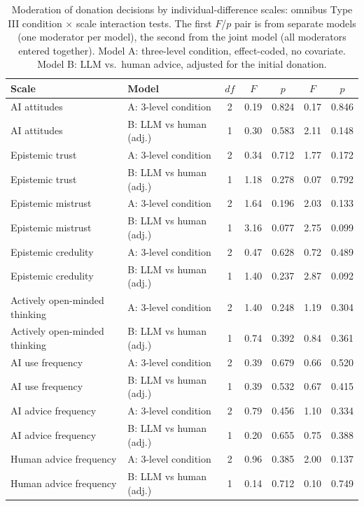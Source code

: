 \begin{table}

\caption{\label{tab:scale_moderation}Moderation of donation decisions by individual-difference scales: omnibus Type III condition $\times$ scale interaction tests. The first $F$/$p$ pair is from separate models (one moderator per model), the second from the joint model (all moderators entered together). Model A: three-level condition, effect-coded, no covariate. Model B: LLM vs.\ human advice, adjusted for the initial donation.}
\centering
\begin{tabular}[t]{llccccc}
\toprule
Scale & Model & $df$ & $F$ & $p$ & $F$ & $p$\\
\midrule
AI attitudes & A: 3-level condition & 2 & 0.19 & 0.824 & 0.17 & 0.846\\
AI attitudes & B: LLM vs human (adj.) & 1 & 0.30 & 0.583 & 2.11 & 0.148\\
Epistemic trust & A: 3-level condition & 2 & 0.34 & 0.712 & 1.77 & 0.172\\
Epistemic trust & B: LLM vs human (adj.) & 1 & 1.18 & 0.278 & 0.07 & 0.792\\
Epistemic mistrust & A: 3-level condition & 2 & 1.64 & 0.196 & 2.03 & 0.133\\
\addlinespace
Epistemic mistrust & B: LLM vs human (adj.) & 1 & 3.16 & 0.077 & 2.75 & 0.099\\
Epistemic credulity & A: 3-level condition & 2 & 0.47 & 0.628 & 0.72 & 0.489\\
Epistemic credulity & B: LLM vs human (adj.) & 1 & 1.40 & 0.237 & 2.87 & 0.092\\
Actively open-minded thinking & A: 3-level condition & 2 & 1.40 & 0.248 & 1.19 & 0.304\\
Actively open-minded thinking & B: LLM vs human (adj.) & 1 & 0.74 & 0.392 & 0.84 & 0.361\\
\addlinespace
AI use frequency & A: 3-level condition & 2 & 0.39 & 0.679 & 0.66 & 0.520\\
AI use frequency & B: LLM vs human (adj.) & 1 & 0.39 & 0.532 & 0.67 & 0.415\\
AI advice frequency & A: 3-level condition & 2 & 0.79 & 0.456 & 1.10 & 0.334\\
AI advice frequency & B: LLM vs human (adj.) & 1 & 0.20 & 0.655 & 0.75 & 0.388\\
Human advice frequency & A: 3-level condition & 2 & 0.96 & 0.385 & 2.00 & 0.137\\
\addlinespace
Human advice frequency & B: LLM vs human (adj.) & 1 & 0.14 & 0.712 & 0.10 & 0.749\\
\bottomrule
\end{tabular}
\end{table}
